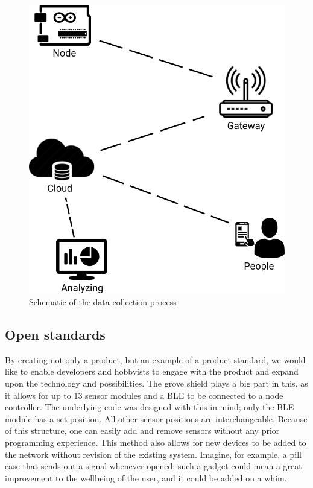 \documentclass{below-ext}
\begin{document}
\begin{figure}
\centering
\includegraphics[scale=0.6]{scheme}
\caption{Schematic of the data collection process}
\label{fig:process}
\end{figure}

\subsection{Open standards}

By creating not only a product, but an example of a product standard, we would like to enable developers and hobbyists to engage with the product and expand upon the technology and possibilities. The grove shield plays a big part in this, as it allows for up to 13 sensor modules and a BLE to be connected to a node controller. The underlying code was designed with this in mind; only the BLE module has a set position. All other sensor positions are interchangeable. Because of this structure, one can easily add and remove sensors without any prior programming experience. This method also allows for new devices to be added to the network without revision of the existing system. Imagine, for example, a pill case that sends out a signal whenever opened; such a gadget could mean a great improvement to the wellbeing of the user, and it could be added on a whim. 
\end{document}

